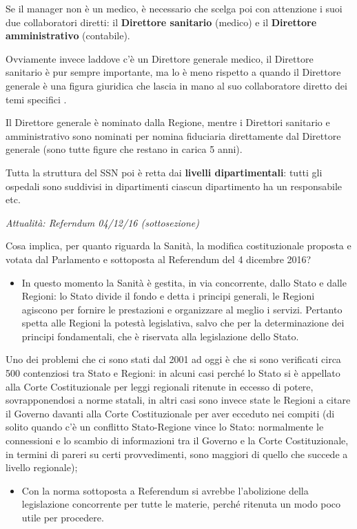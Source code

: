 \documentclass[]{article}
\begin{document}
Se il manager non è un medico, è necessario che scelga poi con
attenzione i suoi due collaboratori diretti: il \textbf{Direttore
sanitario} (medico) e il \textbf{Direttore amministrativo} (contabile).

Ovviamente invece laddove c'è un Direttore generale medico, il Direttore
sanitario è pur sempre importante, ma lo è meno rispetto a quando il
Direttore generale è una figura giuridica che lascia in mano al suo
collaboratore diretto dei temi specifici .

Il Direttore generale è nominato dalla Regione, mentre i Direttori
sanitario e amministrativo sono nominati per nomina fiduciaria
direttamente dal Direttore generale (sono tutte figure che restano in
carica 5 anni).

Tutta la struttura del SSN poi è retta dai \textbf{livelli
dipartimentali}: tutti gli ospedali sono suddivisi in dipartimenti
ciascun dipartimento ha un responsabile etc.

\emph{Attualità: Referndum 04/12/16 (sottosezione)}

Cosa implica, per quanto riguarda la Sanità, la modifica costituzionale
proposta e votata dal Parlamento e sottoposta al Referendum del 4
dicembre 2016?

\begin{itemize}
\item
  In questo momento la Sanità è gestita, in via concorrente, dallo Stato
  e dalle Regioni: lo Stato divide il fondo e detta i principi generali,
  le Regioni agiscono per fornire le prestazioni e organizzare al meglio
  i servizi. Pertanto spetta alle Regioni la potestà legislativa, salvo
  che per la determinazione dei principi fondamentali, che è riservata
  alla legislazione dello Stato.
\end{itemize}

Uno dei problemi che ci sono stati dal 2001 ad oggi è che si sono
verificati circa 500 contenziosi tra Stato e Regioni: in alcuni casi
perché lo Stato si è appellato alla Corte Costituzionale per leggi
regionali ritenute in eccesso di potere, sovrapponendosi a norme
statali, in altri casi sono invece state le Regioni a citare il Governo
davanti alla Corte Costituzionale per aver ecceduto nei compiti (di
solito quando c'è un conflitto Stato-Regione vince lo Stato: normalmente
le connessioni e lo scambio di informazioni tra il Governo e la Corte
Costituzionale, in termini di pareri su certi provvedimenti, sono
maggiori di quello che succede a livello regionale);

\begin{itemize}
\item
  Con la norma sottoposta a Referendum si avrebbe l'abolizione della
  legislazione concorrente per tutte le materie, perché ritenuta un modo
  poco utile per procedere.
\end{itemize}
\end{document}
